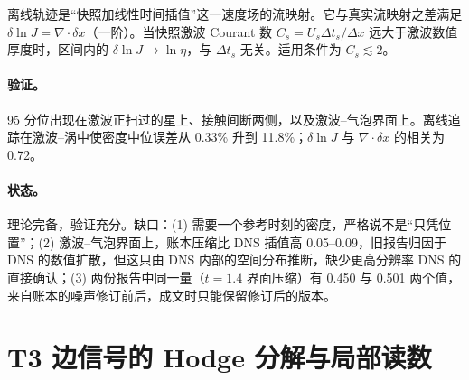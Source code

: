 \begin{proposition}[离线追踪的误差恒等式]
离线轨迹是“快照加线性时间插值”这一速度场的流映射。它与真实流映射之差满足 $\delta\ln J=\nabla\cdot\delta x$（一阶）。当快照激波 Courant 数 $C_s=U_s\Delta t_s/\Delta x$ 远大于激波数值厚度时，区间内的 $\delta\ln J\to\ln\eta$，与 $\Delta t_s$ 无关。适用条件为 $C_s\lesssim2$。
\end{proposition}

\paragraph{验证。}
\begin{center}\small
{}\end{center}
95 分位出现在激波正扫过的星上、接触间断两侧，以及激波–气泡界面上。离线追踪在激波–涡中使密度中位误差从 0.33\% 升到 11.8\%；$\delta\ln J$ 与 $\nabla\cdot\delta x$ 的相关为 0.72。

\paragraph{状态。}理论完备，验证充分。缺口：(1) 需要一个参考时刻的密度，严格说不是“只凭位置”；(2) 激波–气泡界面上，账本压缩比 DNS 插值高 0.05–0.09，旧报告归因于 DNS 的数值扩散，但这只由 DNS 内部的空间分布推断，缺少更高分辨率 DNS 的直接确认；(3) 两份报告中同一量（$t=1.4$ 界面压缩）有 0.450 与 0.501 两个值，来自账本的噪声修订前后，成文时只能保留修订后的版本。

\section{T3 边信号的 Hodge 分解与局部读数}

